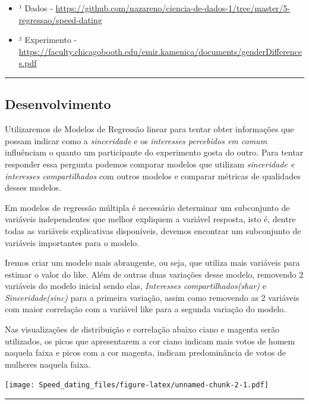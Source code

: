 \documentclass[]{article}
\providecommand{\tightlist}{%
  \setlength{\itemsep}{0pt}\setlength{\parskip}{0pt}}
\begin{document}
\begin{itemize}
\tightlist
\item
  ¹ Dados -
  \url{https://github.com/nazareno/ciencia-de-dados-1/tree/master/5-regressao/speed-dating}
\item
  ² Experimento -
  \url{https://faculty.chicagobooth.edu/emir.kamenica/documents/genderDifferences.pdf}
\end{itemize}

\begin{center}\rule{0.5\linewidth}{\linethickness}\end{center}

\hypertarget{desenvolvimento}{%
\subsection{Desenvolvimento}\label{desenvolvimento}}

Utilizaremos de Modelos de Regressão linear para tentar obter
informações que possam indicar como a \emph{sinceridade} e os
\emph{interesses percebidos em comum} influênciam o quanto um
participante do experimento gosta do outro. Para tentar responder essa
pergunta podemos comparar modelos que utilizam \emph{sinceridade e
interesses compartilhados} com outros modelos e comparar métricas de
qualidades desses modelos.

Em modelos de regressão múltipla é necessário determinar um subconjunto
de variáveis independentes que melhor expliquem a variável resposta,
isto é, dentre todas as variáveis explicativas disponíveis, devemos
encontrar um subconjunto de variáveis importantes para o modelo.

Iremos criar um modelo mais abrangente, ou seja, que utiliza mais
variáveis para estimar o valor do like. Além de outras duas variações
desse modelo, removendo 2 variáveis do modelo inicial sendo elas,
\emph{Interesses compartilhados(shar)} e \emph{Sinceridade(sinc)} para a
primeira variação, assim como removendo as 2 variáveis com maior
correlação com a variável like para a segunda variação do modelo.

Nas visualizações de distribuição e correlação abaixo ciano e magenta
serão utilizados, os picos que apresentarem a cor ciano indicam mais
votos de homem naquela faixa e picos com a cor magenta, indicam
predominância de votos de mulheres naquela faixa.

\texttt{[image: Speed\_dating\_files/figure-latex/unnamed-chunk-2-1.pdf]}

\begin{center}\rule{0.5\linewidth}{\linethickness}\end{center}
\end{document}
